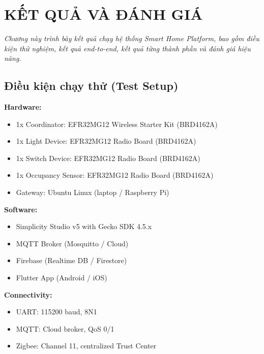 \chapter{KẾT QUẢ VÀ ĐÁNH GIÁ}
\label{ch:ketqua}

\vspace{0.5cm}
\noindent\textit{Chương này trình bày kết quả chạy hệ thống Smart Home Platform, bao gồm điều kiện thử nghiệm, kết quả end-to-end, kết quả từng thành phần và đánh giá hiệu năng.}
\vspace{0.5cm}

\section{Điều kiện chạy thử (Test Setup)}
\label{sec:ch4-test-setup}

\textbf{Hardware:}
\begin{itemize}
    \item 1x Coordinator: EFR32MG12 Wireless Starter Kit (BRD4162A)
    \item 1x Light Device: EFR32MG12 Radio Board (BRD4162A)
    \item 1x Switch Device: EFR32MG12 Radio Board (BRD4162A)
    \item 1x Occupancy Sensor: EFR32MG12 Radio Board (BRD4162A)
    \item Gateway: Ubuntu Linux (laptop / Raspberry Pi)
\end{itemize}

\textbf{Software:}
\begin{itemize}
    \item Simplicity Studio v5 with Gecko SDK 4.5.x
    \item MQTT Broker (Mosquitto / Cloud)
    \item Firebase (Realtime DB / Firestore)
    \item Flutter App (Android / iOS)
\end{itemize}

\textbf{Connectivity:}
\begin{itemize}
    \item UART: 115200 baud, 8N1
    \item MQTT: Cloud broker, QoS 0/1
    \item Zigbee: Channel 11, centralized Trust Center
\end{itemize}

